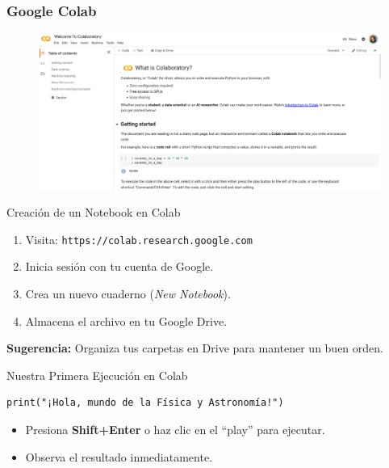 \documentclass[10pt]{beamer}
\begin{document}
\begin{frame}
  \frametitle{Google Colab}
  \begin{figure}
    \includegraphics[width=1.00\textwidth]{2) Colab/GColab01.png}
  \end{figure}
\end{frame}
\begin{frame}{Creación de un Notebook en Colab}
  \begin{enumerate}
    \item Visita: \texttt{https://colab.research.google.com}
    \item Inicia sesión con tu cuenta de Google.
    \item Crea un nuevo cuaderno (\emph{New Notebook}).
    \item Almacena el archivo en tu Google Drive.
  \end{enumerate}
  \textbf{Sugerencia:} Organiza tus carpetas en Drive para mantener un buen orden.
\end{frame}

\begin{frame}[fragile]{Nuestra Primera Ejecución en Colab}
\begin{verbatim}
print("¡Hola, mundo de la Física y Astronomía!")
\end{verbatim}
\begin{itemize}
  \item Presiona \textbf{Shift+Enter} o haz clic en el “play” para ejecutar.
  \item Observa el resultado inmediatamente.
\end{itemize}
\end{frame}
\end{document}
